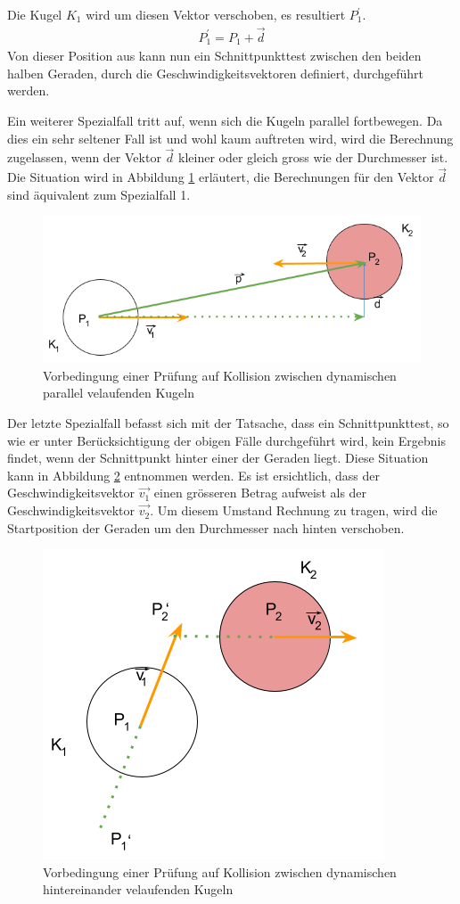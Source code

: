 Die Kugel $K_1$ wird um diesen Vektor verschoben, es resultiert $P^{'}_1$.
\begin{align}
    P^{'}_1 = P_1 + \vec{d}
\end{align}
Von dieser Position aus kann nun ein Schnittpunkttest zwischen den beiden
halben Geraden, durch die Geschwindigkeitsvektoren definiert, durchgeführt werden.

Ein weiterer Spezialfall tritt auf, wenn sich die Kugeln parallel fortbewegen. Da dies ein sehr seltener Fall ist und
wohl kaum auftreten wird, wird die Berechnung zugelassen, wenn der Vektor $\vec{d}$ kleiner oder gleich gross
wie der Durchmesser ist. Die Situation wird in Abbildung \ref{fig:kugelkollision_vorbedingung_dynamisch_parallel} erläutert, die Berechnungen für den Vektor $\vec{d}$
sind äquivalent zum Spezialfall 1.
\begin{figure}[h!]
    \begin{center}
        \includegraphics[width=0.4\linewidth]{../common/03_billiard_ai/resources/26_vorbedingung_kugelkollision_dynamisch_parallel.png}
    \end{center}
    \caption{Vorbedingung einer Prüfung auf Kollision zwischen dynamischen parallel velaufenden Kugeln}
    \label{fig:kugelkollision_vorbedingung_dynamisch_parallel}
\end{figure}

Der letzte Spezialfall befasst sich mit der Tatsache, dass ein Schnittpunkttest, so wie er unter Berücksichtigung der
obigen Fälle durchgeführt wird, kein Ergebnis findet, wenn der Schnittpunkt hinter einer der Geraden liegt.
Diese Situation kann in Abbildung \ref{fig:kugelkollision_vorbedingung_dynamisch_hintereinander} entnommen werden.
Es ist ersichtlich, dass der Geschwindigkeitsvektor $\vec{v_1}$ einen grösseren Betrag aufweist als der
Geschwindigkeitsvektor $\vec{v_2}$. Um diesem Umstand Rechnung zu tragen, wird die Startposition der Geraden um den
Durchmesser nach hinten verschoben.
\begin{figure}[h!]
    \begin{center}
        \includegraphics[width=0.4\linewidth]{../common/03_billiard_ai/resources/27_vorbedingung_kugelkollision_dynamisch_hintereinander.png}
    \end{center}
    \caption{Vorbedingung einer Prüfung auf Kollision zwischen dynamischen hintereinander velaufenden Kugeln}
    \label{fig:kugelkollision_vorbedingung_dynamisch_hintereinander}
\end{figure}

